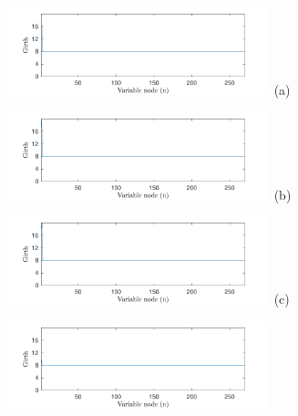 \begin{figure}[tb]
	\centering
	\hspace{-0.25 cm}
	\begin{minipage}{.5\linewidth}
		\hspace{-0.45 cm}
		\includegraphics[width=3in]{pics/girth/girthpeg4-9.pdf}
		\vspace{-1cm}
		\center (a)
	\end{minipage}
	\hfill
	\begin{minipage}{.5\linewidth}
		\hspace{-0.45 cm}
		\includegraphics[width=3in]{pics/girth/girthpeg3-5.pdf}
		\vspace{-1cm}
		\center (b)
	\end{minipage}
	\hspace{-0.2 cm}
	\begin{minipage}{.5\linewidth}
		\hspace{-0.45 cm}
		\includegraphics[width=3in]{pics/girth/girthpeg2-3.pdf}
		\vspace{-1cm}
		\center (c)
	\end{minipage}
	\hfill
	\hspace{-0.2 cm}
	\begin{minipage}{.5\linewidth}
		\hspace{-0.45 cm}
		\includegraphics[width=3in]{pics/girth/girthpeg11-15.pdf}

\end{minipage}
\end{figure}
